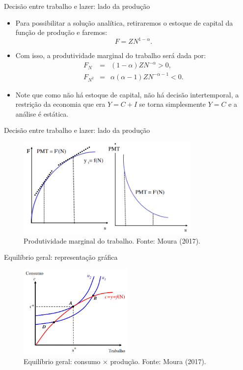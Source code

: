 \documentclass[10pt]{beamer}
\begin{document}
\begin{frame}{Decisão entre trabalho e lazer: lado da produção}
    \begin{itemize}
        \item Para possibilitar a solução analítica, retiraremos o estoque de capital da função de produção e faremos:
        \[
        F = ZN^{1-\alpha}.
        \]
        \bigskip
        \item Com isso, a produtividade marginal do trabalho será dada por:
        \begin{eqnarray*}
        F_N &=& (1-\alpha)ZN^{-\alpha} > 0, \\
        F_{N^2} &=& \alpha(\alpha-1)ZN^{-\alpha-1} < 0.
        \end{eqnarray*}
        \bigskip
        \item Note que como não há estoque de capital, não há decisão intertemporal, a restrição da economia que era $Y = C + I$ se torna simplesmente $Y = C$ e a análise é estática.
    \end{itemize}
\end{frame}

\begin{frame}{Decisão entre trabalho e lazer: lado da produção}
    \begin{figure}
        \centering
        \includegraphics[width=0.8\textwidth]{./figures/aula14_fig9.PNG}
        \caption{Produtividade marginal do trabalho. Fonte: Moura (2017).}
        \label{fig9}
    \end{figure}
\end{frame}

\begin{frame}{Equilíbrio geral: representação gráfica}
    \begin{figure}
        \centering
        \includegraphics[width=0.5\textwidth]{./figures/aula14_fig10.PNG}
        \caption{Equilíbrio geral: consumo $\times$ produção. Fonte: Moura (2017).}
        \label{fig10}
    \end{figure}
\end{frame}
\end{document}

